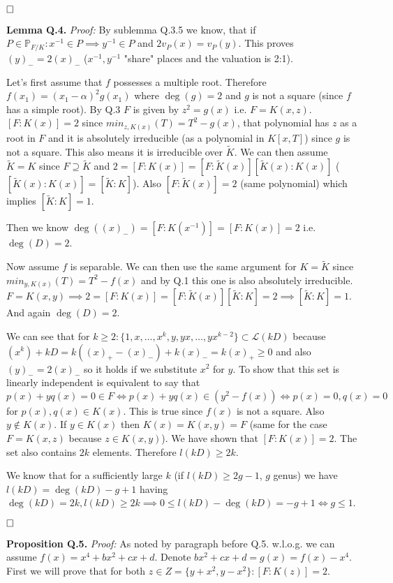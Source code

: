 \documentclass[12pt, a4paper]{article}
\newcommand{\qed}{\hfill\square}
\begin{document}
$\qed$

\textbf{Lemma Q.4.} \textit{Proof:}
By sublemma Q.3.5 we know, that if $P \in \mathbb{P}_{F/K}: x^{-1} \in P \implies y^{-1} \in P$ and $2v_P(x)=v_P(y)$. This proves $(y)_{-}=2(x)_{-}$ ($x^{-1},y^{-1}$ "share" places and the valuation is 2:1).

Let's first assume that $f$ possesses a multiple root. Therefore $f(x_1) = (x_1-\alpha)^2g(x_1)$ where $\deg(g) = 2$ and $g$ is not a square (since $f$ has a simple root). By Q.3 $F$ is given by $z^2 = g(x)$ i.e. $F=K(x,z)$. $[F:K(x)]=2$ since $min_{z,K(x)}(T) = T^2 - g(x)$, that polynomial has $z$ as a root in $F$ and it is absolutely irreducible (as a polynomial in $K[x,T]$) since $g$ is not a square. This also means it is irreducible over $\tilde{K}$. We can then assume $\tilde{K}=K$ since $F \supseteq \tilde{K}$ and $2 = [F:K(x)] = [F:\tilde{K}(x)] [\tilde{K}(x):K(x)]$ ($[\tilde{K}(x):K(x)]=[\tilde{K}:K]$). Also $[F:\tilde{K}(x)]=2$ (same polynomial) which implies $[\tilde{K}:K] = 1$.

Then we know $\deg((x)_{-}) = [F:K(x^{-1})] = [F:K(x)] = 2$ i.e. $\deg(D)=2$.

Now assume $f$ is separable. We can then use the same argument for $K=\tilde{K}$ since $min_{y,K(x)}(T) = T^2-f(x)$ and by Q.1 this one is also absolutely irreducible. $F=K(x,y) \implies 2=[F:K(x)] = [F:\tilde{K}(x)][\tilde{K}:K] = 2 \implies [\tilde{K}:K]=1$. And again $\deg(D)=2$.

We can see that for $k \geq 2: \{1,x,\dots,x^k, y, yx, \dots, yx^{k-2}\} \subset \mathcal{L}(kD)$ because $(x^k) + kD = k((x)_{+}-(x)_{-})+k(x)_{-} = k(x)_{+} \geq 0$ and also $(y)_{-}=2(x)_{-}$ so it holds if we substitute $x^2$ for $y$. To show that this set is linearly independent is equivalent to say that $p(x)+yq(x) = 0 \in F \iff p(x)+yq(x) \in (y^2-f(x)) \iff p(x)=0,q(x)=0$ for $p(x),q(x) \in K(x)$. This is true since $f(x)$ is not a square. Also $y \notin K(x)$. If $y \in K(x)$ then $K(x)=K(x,y)=F$ (same for the case $F=K(x,z)$ because $z \in K(x,y)$). We have shown that $[F:K(x)]=2$. The set also contains $2k$ elements. Therefore $l(kD) \geq 2k$. 

We know that for a sufficiently large $k$ (if $l(kD) \geq 2g-1$, $g$ genus) we have $l(kD) = \deg(kD)-g+1$ having $\deg(kD)=2k, l(kD) \geq 2k \implies 0 \leq l(kD)-\deg(kD) = -g + 1 \iff g \leq 1$.

$\qed$

\textbf{Proposition Q.5.} \textit{Proof:}
As noted by paragraph before Q.5. w.l.o.g. we can assume $f(x) = x^4+bx^2+cx+d$. Denote $bx^2+cx+d = g(x)=f(x)-x^4$. First we will prove that for both $z \in Z = \{y+x^2, y-x^2\}: [F:K(z)]=2$. 
\end{document}
